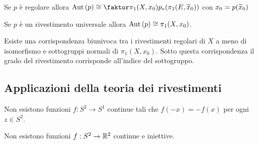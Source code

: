\begin{multicols*}{2}
\begin{proposition}\label{AutomorfismiRivestimentiRegolari}
Se $p$ \`e regolare allora $\Aut(p)\cong \quot {\gf X{x_0}}{p_\ast(\gf E{\wt x_0})}$ con $x_0=p(\widetilde{x}_0)$
\end{proposition}

\begin{corollary}\label{AutomorfismiDelRivestimentoUniversaleSonoIlGruppoFondamentale}
Se $p$ \`e un rivestimento universale allora $\mathrm{Aut}\,(p)\cong \pi_1(X,x_0)$.
\end{corollary}






\begin{corollary}\label{CorrispondenzaGaloisRivestimentiRegolari}
Esiste una corrispondenza biunivoca tra i rivestimenti regolari di $X$ a meno di isomorfismo e sottogruppi normali di $\pi_1(X,x_0)$.
Sotto questa corrispondenza il grado del rivestimento corrisponde all'indice del sottogruppo.
\end{corollary}

\subsection{Applicazioni della teoria dei rivestimenti}
\begin{theorem}\label{TeoremaBorsukUlam}
Non esistono funzioni $f:S^2\to S^1$ continue tali che $f(-x)=-f(x)$ per ogni $z\in S^2$.
\end{theorem}

\begin{theorem}
Non esistono funzioni $f:S^2\to \mathbb{R}^2$ continue e iniettive.
\end{theorem}

\end{multicols*}
